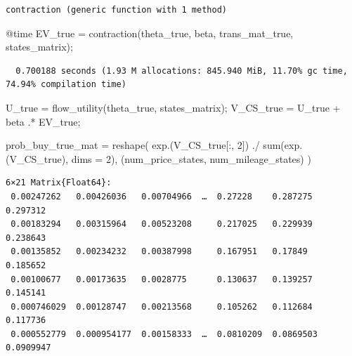 \documentclass[
  letterpaper,
  DIV=11,
  numbers=noendperiod]{scrreprt}
\newenvironment{Shaded}{\begin{snugshade}}{\end{snugshade}}
\newcommand{\FloatTok}[1]{\textcolor[rgb]{0.68,0.00,0.00}{#1}}
\newcommand{\FunctionTok}[1]{\textcolor[rgb]{0.28,0.35,0.67}{#1}}
\newcommand{\NormalTok}[1]{\textcolor[rgb]{0.00,0.23,0.31}{#1}}
\newcommand{\OperatorTok}[1]{\textcolor[rgb]{0.37,0.37,0.37}{#1}}
\newcommand{\PreprocessorTok}[1]{\textcolor[rgb]{0.68,0.00,0.00}{#1}}
\begin{document}
\begin{verbatim}
contraction (generic function with 1 method)
\end{verbatim}

\begin{Shaded}
\begin{Highlighting}[]
\PreprocessorTok{@time}\NormalTok{ EV\_true }\OperatorTok{=} \FunctionTok{contraction}\NormalTok{(theta\_true, beta, trans\_mat\_true, states\_matrix);}
\end{Highlighting}
\end{Shaded}

\begin{verbatim}
  0.700188 seconds (1.93 M allocations: 845.940 MiB, 11.70% gc time, 74.94% compilation time)
\end{verbatim}

\begin{Shaded}
\begin{Highlighting}[]
\NormalTok{U\_true }\OperatorTok{=} \FunctionTok{flow\_utility}\NormalTok{(theta\_true, states\_matrix);}
\NormalTok{V\_CS\_true }\OperatorTok{=}\NormalTok{ U\_true }\OperatorTok{+}\NormalTok{ beta }\OperatorTok{.*}\NormalTok{ EV\_true;}
\end{Highlighting}
\end{Shaded}

\begin{Shaded}
\begin{Highlighting}[]
\NormalTok{prob\_buy\_true\_mat }\OperatorTok{=} \FunctionTok{reshape}\NormalTok{(}
    \FunctionTok{exp}\NormalTok{.(V\_CS\_true[}\OperatorTok{:}\NormalTok{, }\FloatTok{2}\NormalTok{]) }\OperatorTok{./} \FunctionTok{sum}\NormalTok{(}\FunctionTok{exp}\NormalTok{.(V\_CS\_true), dims }\OperatorTok{=} \FloatTok{2}\NormalTok{), }
\NormalTok{    (num\_price\_states, num\_mileage\_states)}
\NormalTok{    )}
\end{Highlighting}
\end{Shaded}

\begin{verbatim}
6×21 Matrix{Float64}:
 0.00247262   0.00426036   0.00704966  …  0.27228    0.287275   0.297312
 0.00183294   0.00315964   0.00523208     0.217025   0.229939   0.238643
 0.00135852   0.00234232   0.00387998     0.167951   0.17849    0.185652
 0.00100677   0.00173635   0.0028775      0.130637   0.139257   0.145141
 0.000746029  0.00128747   0.00213568     0.105262   0.112684   0.117736
 0.000552779  0.000954177  0.00158333  …  0.0810209  0.0869503  0.0909947
\end{verbatim}
\end{document}
